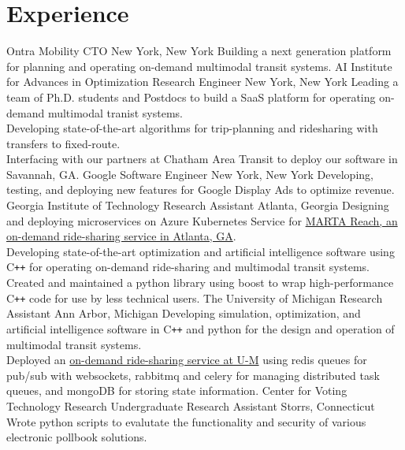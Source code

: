 \section{Experience}
		{Ontra Mobility}
		{CTO}
		{New York, New York}{}
		{Building a next generation platform for planning and operating on-demand multimodal transit systems.}
		{AI Institute for Advances in Optimization}
		{Research Engineer}
		{New York, New York}{}
		{Leading a team of Ph.D. students and Postdocs to build a SaaS platform for operating on-demand multimodal tranist systems. \\
		Developing state-of-the-art algorithms for trip-planning and ridesharing with transfers to fixed-route. \\
		Interfacing with our partners at Chatham Area Transit to deploy our software in Savannah, GA.}
		{Google}
		{Software Engineer}
		{New York, New York}{}
		{Developing, testing, and deploying new features for Google Display Ads to optimize revenue.}
		{Georgia Institute of Technology}
		{Research Assistant}
		{Atlanta, Georgia}{}
		{Designing and deploying microservices on Azure Kubernetes Service for \href{https://www.itsmarta.com/reach.aspx}{MARTA Reach, an on-demand ride-sharing service in Atlanta, GA}. \\
        Developing state-of-the-art optimization and artificial intelligence software using C\texttt{++} for operating on-demand ride-sharing and multimodal transit systems. \\
        Created and maintained a python library using boost to wrap high-performance C\texttt{++} code for use by less technical users.}
		{The University of Michigan}
		{Research Assistant}
		{Ann Arbor, Michigan}{}
		{Developing simulation, optimization, and artificial intelligence software in C\texttt{++} and python for the design and operation of multimodal transit systems. \\
		Deployed an \href{https://record.umich.edu/articles/north-campus-first-test-site-hybrid-transportation-system/}{on-demand ride-sharing service at U-M} using redis queues for pub/sub with websockets, rabbitmq and celery for managing distributed task queues, and mongoDB for storing state information.}
		{Center for Voting Technology Research}
		{Undergraduate Research Assistant}
		{Storrs, Connecticut}{}
        {Wrote python scripts to evalutate the functionality and security of various electronic pollbook solutions.}

